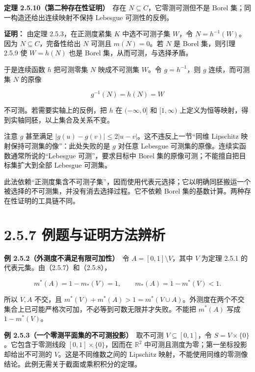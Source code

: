 \documentclass[11pt,a4paper]{article}
\begin{document}
\textbf{定理 2.5.10（第二种存在性证明）}　存在
\(N\subseteq C\)，它零测可测但不是 Borel
集；同一构造还给出连续映射不保持 Lebesgue 可测性的反例。

\textbf{证明：} 由定理 2.5.3，在正测度紧集 \(K\) 中选不可测子集
\(W\)，令 \(N=h^{-1}(W)\)。因为 \(N\subseteq C\)，完备性给出 \(N\)
可测且 \(m(N)=0\)。若 \(N\) 是 Borel 集，则引理 2.5.9 使 \(W=h(N)\) 也是
Borel 集，从而可测，与选择矛盾。

于是连续函数 \(h\) 把可测零集 \(N\) 映成不可测集 \(W\)。令
\(g=h^{-1}\)，则 \(g\) 连续，而可测集 \(N\) 的原像

\begin{equation*}
g^{-1}(N)=h(N)=W
\tag{2.5.12}
\end{equation*}

不可测。若需要实轴上的反例，把 \(h\) 在 \((-\infty,0]\) 和
\([1,\infty)\) 上定义为恒等映射，得到实轴同胚，以上集合及关系不变。

注意 \(g\) 甚至满足 \(|g(u)-g(v)|\le2|u-v|\)。这不违反上一节``同维
Lipschitz 映射保持可测集的像''：此处失败的是 \(g\) 对任意 Lebesgue
可测集的原像。连续实函数通常所说的``Lebesgue 可测''，要求目标中 Borel
集的原像可测；不能擅自把目标集扩大到全部 Lebesgue 可测集。

此法依赖``正测度集含不可测子集''，因而使用代表元选择；它以明确同胚搬运一个被选择的不可测集，并没有消去选择过程。它不依赖
Borel 集的基数计算。两种存在性证明的工具链不同。

\section[\S{}2.5.7
例题与证明方法辨析]{2.5.7
例题与证明方法辨析}\label{ux4f8bux9898ux4e0eux8bc1ux660eux65b9ux6cd5ux8fa8ux6790}

\textbf{例 2.5.2（外测度不满足有限可加性）}　令
\(A=[0,1]\setminus V\)，其中 \(V\) 为定理 2.5.1
的代表元集。由（2.5.7）和（2.5.8），

\begin{equation*}
m^*(A)=1-m_*(V)=1,\qquad
m_*(A)=1-m^*(V)<1.
\tag{2.5.13}
\end{equation*}

所以 \(V,A\) 不交，且
\(m^*(V)+m^*(A)>1=m^*(V\cup A)\)。外测度在两个不交集合上已可能严格次可加，不必等到可数无限并才失败。不能把
\(m^*(A)\) 写成 \(1-m^*(V)\)。

\textbf{例 2.5.3（一个零测平面集的不可测投影）}　取不可测
\(V\subseteq[0,1]\)，令 \(S=V\times\{0\}\)。它包含于零测线段
\([0,1]\times\{0\}\)，因而在 \(\mathbb R^2\)
中可测且测度为零；第一坐标投影却给出不可测的 \(V\)。这是不同维数之间的
Lipschitz
映射，不能使用同维的零测像结论。此例无需关于截面或乘积积分的定理。
\end{document}
